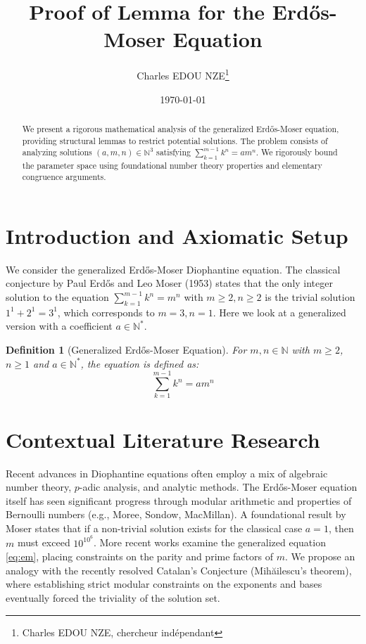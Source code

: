 \documentclass[11pt,a4paper]{article}
\title{Proof of Lemma for the Erdős-Moser Equation}
\author{Charles EDOU NZE\thanks{Charles EDOU NZE, chercheur indépendant}}
\date{\today}
\newtheorem{definition}{Definition}
\begin{document}
\maketitle

\begin{abstract}
We present a rigorous mathematical analysis of the generalized Erdős-Moser equation, providing structural lemmas to restrict potential solutions. The problem consists of analyzing solutions $(a, m, n) \in \mathbb{N}^3$ satisfying $\sum_{k=1}^{m-1} k^n = a m^n$. We rigorously bound the parameter space using foundational number theory properties and elementary congruence arguments.
\end{abstract}

\section{Introduction and Axiomatic Setup}

We consider the generalized Erdős-Moser Diophantine equation. The classical conjecture by Paul Erdős and Leo Moser (1953) states that the only integer solution to the equation $\sum_{k=1}^{m-1} k^n = m^n$ with $m \ge 2, n \ge 2$ is the trivial solution $1^1 + 2^1 = 3^1$, which corresponds to $m=3, n=1$. Here we look at a generalized version with a coefficient $a \in \mathbb{N}^*$.

\begin{definition}[Generalized Erdős-Moser Equation]
For $m, n \in \mathbb{N}$ with $m \ge 2$, $n \ge 1$ and $a \in \mathbb{N}^*$, the equation is defined as:
\begin{equation}
\sum_{k=1}^{m-1} k^n = a m^n
\label{eq:em}
\end{equation}
\end{definition}

\section{Contextual Literature Research}

Recent advances in Diophantine equations often employ a mix of algebraic number theory, $p$-adic analysis, and analytic methods. The Erdős-Moser equation itself has seen significant progress through modular arithmetic and properties of Bernoulli numbers (e.g., Moree, Sondow, MacMillan). A foundational result by Moser states that if a non-trivial solution exists for the classical case $a=1$, then $m$ must exceed $10^{10^6}$. More recent works examine the generalized equation \eqref{eq:em}, placing constraints on the parity and prime factors of $m$. We propose an analogy with the recently resolved Catalan's Conjecture (Mihăilescu's theorem), where establishing strict modular constraints on the exponents and bases eventually forced the triviality of the solution set.
\end{document}
